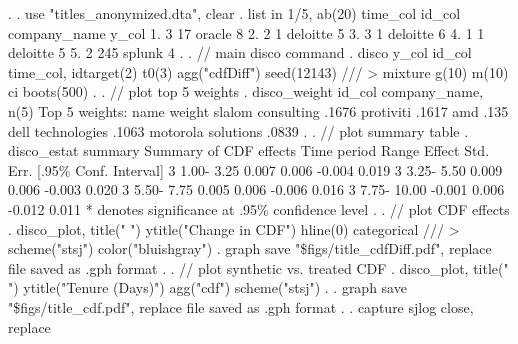 . 
. use "titles_anonymized.dta", clear 
{\smallskip}
. list in 1/5, ab(20) 
{\smallskip}
     {\TLC}
     {\VBAR} time_col   id_col   company_name   y_col {\VBAR}
     {\LFTT}
  1. {\VBAR}        3       17         oracle       8 {\VBAR}
  2. {\VBAR}        2        1       deloitte       5 {\VBAR}
  3. {\VBAR}        3        1       deloitte       6 {\VBAR}
  4. {\VBAR}        1        1       deloitte       5 {\VBAR}
  5. {\VBAR}        2      245         splunk       4 {\VBAR}
     {\BLC}
{\smallskip}
. 
. // main disco command
. disco y_col id_col time_col, idtarget(2) t0(3) agg("cdfDiff") seed(12143) /// 
>         mixture g(10) m(10) ci boots(500)
{\smallskip}
.          
. // plot top 5 weights
. disco_weight id_col company_name, n(5)
{\smallskip}
Top 5 weights:
{\smallskip}
  {\TLC}
  {\VBAR}               name {\VBAR} weight {\VBAR}
  {\LFTT}
  {\VBAR}  slalom consulting {\VBAR}  .1676 {\VBAR}
  {\VBAR}          protiviti {\VBAR}  .1617 {\VBAR}
  {\VBAR}                amd {\VBAR}   .135 {\VBAR}
  {\VBAR}  dell technologies {\VBAR}  .1063 {\VBAR}
  {\VBAR} motorola solutions {\VBAR}  .0839 {\VBAR}
  {\BLC}
{\smallskip}
. 
. // plot summary table
. disco_estat summary
{\smallskip}
Summary of CDF effects
Time period   Range                    Effect     Std. Err.    [.95\% Conf. Interval]
        3         1.00-     3.25        0.007        0.006       -0.004      0.019
        3         3.25-     5.50        0.009        0.006       -0.003      0.020
        3         5.50-     7.75        0.005        0.006       -0.006      0.016
        3         7.75-    10.00       -0.001        0.006       -0.012      0.011
* denotes significance at .95\% confidence level
{\smallskip}
. 
. // plot CDF effects
. disco_plot, title(" ") ytitle("Change in CDF") hline(0) categorical /// 
>         scheme("stsj") color("bluishgray") 
{\smallskip}
. graph save "\${\lbr}figs{\rbr}/title_cdfDiff.pdf", replace
file {}
{} saved as .gph format
{\smallskip}
. 
. // plot synthetic vs. treated CDF
. disco_plot, title(" ") ytitle("Tenure (Days)") agg("cdf") scheme("stsj")
{\smallskip}
. 
. graph save "\${\lbr}figs{\rbr}/title_cdf.pdf", replace
file {}
{} saved as .gph format
{\smallskip}
. 
. capture sjlog close, replace
{\smallskip}
